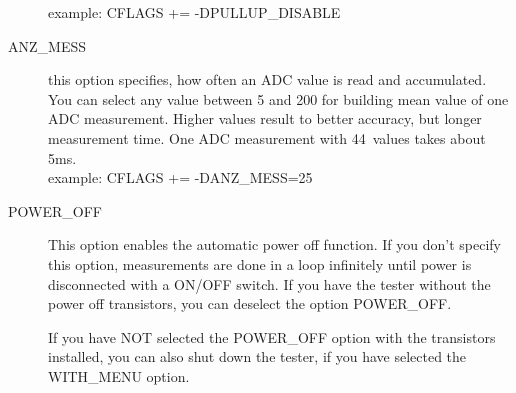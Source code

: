 \begin{description}
example: CFLAGS += -DPULLUP\_DISABLE
  \item[ANZ\_MESS] this option specifies, how often an ADC value is read and accumulated.
You can select any value between 5 and 200 for building mean value of one ADC measurement.
Higher values result to better accuracy, but  longer measurement time.
One ADC measurement with 44~values takes about 5ms.\\
example: CFLAGS += -DANZ\_MESS=25
  \item[POWER\_OFF] This option enables the automatic power off function. If you don't specify this option,
 measurements are done in a loop infinitely  until power is disconnected with a ON/OFF switch.
If you have the tester without the power off transistors, you can deselect the option POWER\_OFF.

If you have NOT selected the POWER\_OFF option with the transistors installed,
you can also shut down the tester, if you have selected the WITH\_MENU option.


\end{description}
